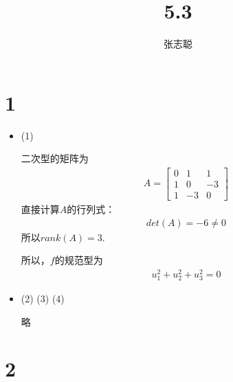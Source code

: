\documentclass{article}
\begin{document}
\title{5.3}
\author{张志聪}
\maketitle

\section*{1}

\begin{itemize}
  \item (1)

        二次型的矩阵为
        \begin{align*}
          A = \begin{bmatrix}
                0 & 1  & 1  \\
                1 & 0  & -3 \\
                1 & -3 & 0
              \end{bmatrix}
        \end{align*}
        直接计算$A$的行列式：
        \begin{align*}
          det(A) = -6 \neq 0
        \end{align*}
        所以$rank(A) = 3$.

        所以，$f$的规范型为
        \begin{align*}
          u_1^2 + u_2^2 + u_3^2 = 0
        \end{align*}

  \item (2) (3) (4)

        略
\end{itemize}

\section*{2}
\end{document}
